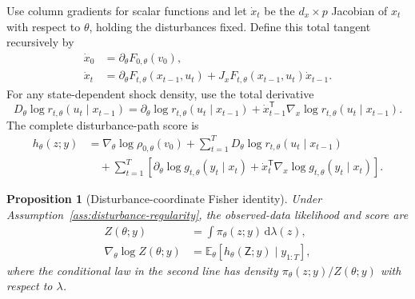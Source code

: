 \documentclass[11pt]{article}
\newtheorem{proposition}{Proposition}
\newcommand{\dd}{\mathrm{d}}
\begin{document}
Use column gradients for scalar functions and let $\dot x_t$ be the
$d_x\times p$ Jacobian of $x_t$ with respect to $\theta$, holding the
disturbances fixed. Define this total tangent recursively by
\begin{align}
 \dot x_0&=\partial_\theta F_{0,\theta}(v_0),\\
 \dot x_t&=\partial_\theta F_{t,\theta}(x_{t-1},u_t)
       +J_xF_{t,\theta}(x_{t-1},u_t)\dot x_{t-1}.
 \label{eq:disturbance-tangent}
\end{align}
For any state-dependent shock density, use the total derivative
\begin{equation}
 D_\theta\log r_{t,\theta}(u_t\mid x_{t-1})
 =\partial_\theta\log r_{t,\theta}(u_t\mid x_{t-1})
  +\dot x_{t-1}^{\mathsf T}\nabla_x\log r_{t,\theta}(u_t\mid x_{t-1}).
 \label{eq:disturbance-shock-total-derivative}
\end{equation}
The complete disturbance-path score is
\begin{align}
 h_\theta(z;y)
 &=\nabla_\theta\log\rho_{0,\theta}(v_0)
   +\sum_{t=1}^T D_\theta\log r_{t,\theta}(u_t\mid x_{t-1})
 \nonumber\\[-2pt]
 &\quad+\sum_{t=1}^T\left[
       \partial_\theta\log g_{t,\theta}(y_t\mid x_t)
       +\dot x_t^{\mathsf T}\nabla_x\log g_{t,\theta}(y_t\mid x_t)\right].
 \label{eq:disturbance-complete-score}
\end{align}

\begin{proposition}[Disturbance-coordinate Fisher identity]
\label{prop:disturbance-fisher}
Under Assumption~\ref{ass:disturbance-regularity}, the observed-data
likelihood and score are
\begin{align}
 Z(\theta;y)&=\int \pi_\theta(z;y)\,\dd\lambda(z),\\
 \nabla_\theta\log Z(\theta;y)
 &=\mathbb E_\theta\!\left[h_\theta(\mathsf Z;y)\mid y_{1:T}\right],
 \label{eq:disturbance-score-identity}
\end{align}
where the conditional law in the second line has density
$\pi_\theta(z;y)/Z(\theta;y)$ with respect to $\lambda$.
\end{proposition}
\end{document}
